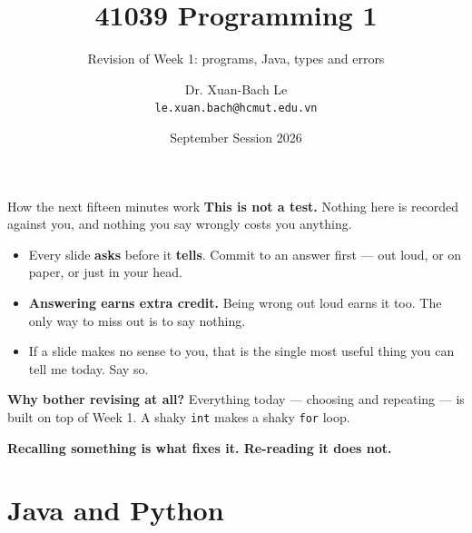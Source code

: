 \documentclass[aspectratio=169]{beamer}
\title[41039 Programming 1 --- Revision of Week 1]{41039 Programming 1}
\subtitle{Revision of Week 1: programs, Java, types and errors}
\author{Dr. Xuan-Bach Le\\ \small\texttt{le.xuan.bach@hcmut.edu.vn}}
\institute{\small Faculty of Computer Science and Engineering, HCMUT}
\date{September Session 2026}
\newcommand{\keyline}[1]{\vfill\begin{center}\textcolor{bkblue}{\textbf{#1}}\end{center}\vspace*{0.2em}}
\newcommand{\hd}[1]{\textbf{#1}}
\newcommand{\code}[1]{\texttt{#1}}
\begin{document}
\begin{frame}[plain]
  \titlepage
\end{frame}

\begin{frame}{How the next fifteen minutes work}
  \hd{This is not a test.} Nothing here is recorded against you, and nothing you say
  wrongly costs you anything.
  \vspace{0.6em}
  \begin{itemize}
    \item Every slide \textbf{asks} before it \textbf{tells}. Commit to an answer first ---
      out loud, or on paper, or just in your head.
    \item \textbf{Answering earns extra credit.} Being wrong out loud earns it too. The only
      way to miss out is to say nothing.
    \item If a slide makes no sense to you, that is the single most useful thing you can
      tell me today. Say so.
  \end{itemize}
  \vspace{0.6em}
  \hd{Why bother revising at all?} Everything today --- choosing and repeating --- is built
  on top of Week 1. A shaky \code{int} makes a shaky \code{for} loop.
  \keyline{Recalling something is what fixes it. Re-reading it does not.}
\end{frame}

\section{Java and Python}
\end{document}
